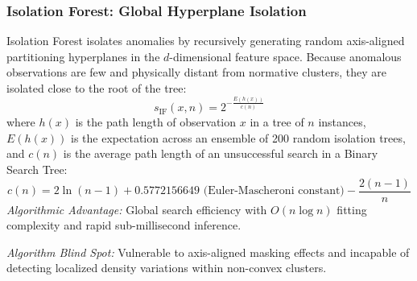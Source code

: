 \subsubsection{Isolation Forest: Global Hyperplane Isolation}
Isolation Forest isolates anomalies by recursively generating random axis-aligned partitioning hyperplanes in the $d$-dimensional feature space. Because anomalous observations are few and physically distant from normative clusters, they are isolated close to the root of the tree:
\begin{equation}
s_{\text{IF}}(x, n) = 2^{-\frac{E(h(x))}{c(n)}}
\end{equation}
where $h(x)$ is the path length of observation $x$ in a tree of $n$ instances, $E(h(x))$ is the expectation across an ensemble of 200 random isolation trees, and $c(n)$ is the average path length of an unsuccessful search in a Binary Search Tree:
\begin{equation}
c(n) = 2 \ln(n - 1) + 0.5772156649 \text{ (Euler-Mascheroni constant)} - \frac{2(n - 1)}{n}
\end{equation}
\textit{Algorithmic Advantage:} Global search efficiency with $O(n \log n)$ fitting complexity and rapid sub-millisecond inference.

\textit{Algorithm Blind Spot:} Vulnerable to axis-aligned masking effects and incapable of detecting localized density variations within non-convex clusters.

